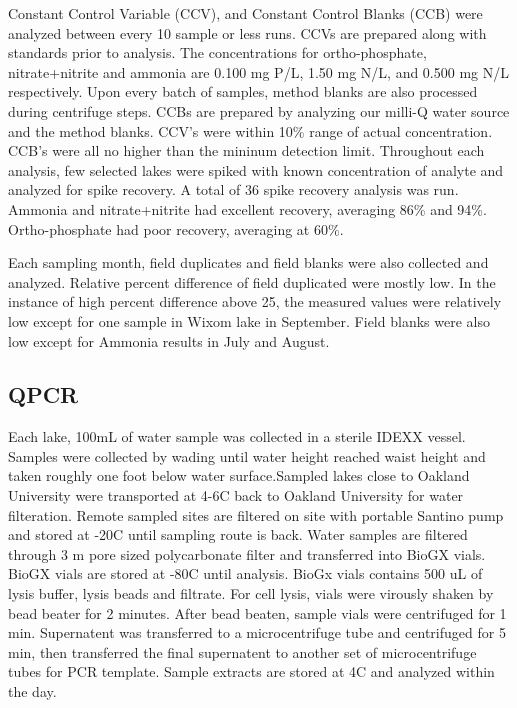 \documentclass{ou-thesis}
\begin{document}
Constant Control Variable (CCV), and Constant Control Blanks (CCB) were analyzed between every 10 sample or less runs. CCVs are prepared along with standards prior to analysis. The concentrations for ortho-phosphate, nitrate+nitrite and ammonia are 0.100 mg P/L, 1.50 mg N/L, and 0.500 mg N/L respectively. Upon every batch of samples, method blanks are also processed during centrifuge steps. CCBs are prepared by analyzing our milli-Q water source and the method blanks. CCV's were within 10\% range of actual concentration. CCB's were all no higher than the mininum detection limit. Throughout each analysis, few selected lakes were spiked with known concentration of analyte and analyzed for spike recovery. A total of 36 spike recovery analysis was run. Ammonia and nitrate+nitrite had excellent recovery, averaging  86\% and 94\%. Ortho-phosphate had poor recovery, averaging at 60\%.

Each sampling month, field duplicates and field blanks were also collected and analyzed. Relative percent difference of field duplicated were mostly low. In the instance of high percent difference above 25, the measured values were relatively low except for one sample in Wixom lake in September. Field blanks were also low except for Ammonia results in July and August.


\subsection{QPCR}

Each lake, 100mL of water sample was collected in a sterile IDEXX vessel. Samples were collected by wading until water height reached waist height and taken roughly one foot below water surface.Sampled lakes close to Oakland University were  transported at 4-6C back to Oakland University for water filteration. Remote sampled sites are filtered on site with portable Santino pump and stored at -20C until sampling route is back. Water samples are filtered through 3  m pore sized polycarbonate filter and transferred into BioGX  vials. BioGX vials are stored at -80C until analysis. BioGx vials contains 500 uL of lysis buffer, lysis beads and filtrate. For cell lysis, vials were virously shaken by bead beater for 2 minutes. After bead beaten, sample vials were centrifuged for 1 min. Supernatent was transferred to a microcentrifuge tube and centrifuged for 5 min, then transferred the final supernatent to another set of microcentrifuge tubes for PCR template.  Sample extracts are stored at 4C and analyzed within the day.
\end{document}
